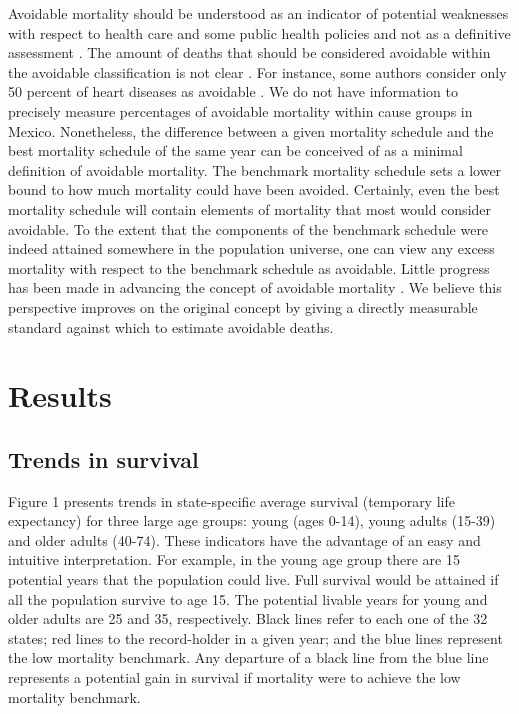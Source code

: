 \documentclass{bmcart}
\begin{document}
Avoidable mortality should be understood as an indicator of potential
weaknesses with respect to health care and some public health policies and not
as a definitive assessment \cite{nolte&mckee2008}. The amount of deaths that should be considered avoidable within the avoidable classification is not clear \cite{beltran2011avoidable}. For instance, some authors consider only 50 percent of heart diseases as avoidable \cite{nolte2012amenable}. We do not have information to precisely
measure percentages of avoidable mortality within cause groups in Mexico. Nonetheless, the
difference between a given mortality schedule and the best mortality schedule of
the same year can be conceived of as a minimal definition of avoidable
mortality. The benchmark mortality schedule sets a lower bound to how much mortality could have been avoided. Certainly, even the best mortality schedule will contain elements of mortality that
most would consider avoidable. To the extent that the components of the benchmark schedule were indeed
attained somewhere in the population universe, one can view any excess mortality
with respect to the benchmark schedule as avoidable. Little progress has been made in advancing the concept of avoidable mortality \cite{holland2003}. We believe this perspective improves on the original concept by giving a directly measurable standard against which to estimate avoidable deaths.


\section*{Results}
\subsection*{Trends in survival}

Figure 1 presents trends in state-specific average survival (temporary life expectancy) for three large age groups: young (ages 0-14), young adults (15-39) and older adults (40-74). These indicators have the advantage of an easy and intuitive interpretation. For example, in the young age group there are 15 potential years that the population could live. Full survival would be attained if  all the population survive to age 15. The potential livable years for young and older adults are 25 and 35, respectively. Black lines refer to each one of the 32 states; red lines to the record-holder in a given year; and the blue lines represent the low mortality benchmark. Any departure of a black line from the blue line represents a potential gain in survival if mortality were to achieve the low mortality benchmark.
\end{document}
